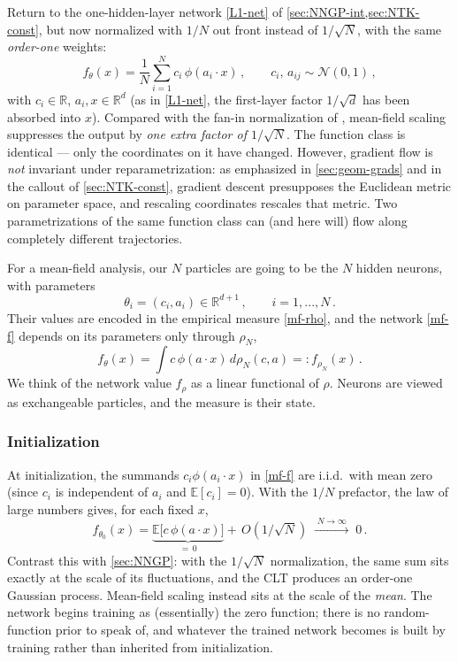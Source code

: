 \documentclass[11pt]{article}
\newcommand{\R}{\mathbb{R}}
\newcommand{\E}{\mathbb{E}}
\newcommand{\CN}{{\mathcal N}}
\begin{document}
Return to the one-hidden-layer network \eqref{L1-net} of \cref{sec:NNGP-int,sec:NTK-const}, but now normalized with $1/N$ out front instead of $1/\sqrt N$, with the same \emph{order-one} weights:
%
\begin{equation} \label{mf-f}
    f_\theta(x) = \frac{1}{N} \sum_{i=1}^N c_i\,\phi(a_i\cdot x)\,,\qquad c_i,\, a_{ij} \sim \CN(0,1)\,,
\end{equation}
%
with $c_i\in\R$, $a_i,x\in\R^d$ (as in \eqref{L1-net}, the first-layer factor $1/\sqrt d$ has been absorbed into $x$). Compared with the fan-in normalization of , mean-field scaling suppresses the output by \emph{one extra factor of $1/\sqrt N$}. The function class is identical --- only the coordinates on it have changed. However, gradient flow is \emph{not} invariant under reparametrization: as emphasized in \cref{sec:geom-grads} and in the callout of \cref{sec:NTK-const}, gradient descent presupposes the Euclidean metric on parameter space, and rescaling coordinates rescales that metric. Two parametrizations of the same function class can (and here will) flow along completely different trajectories.

For a mean-field analysis, our $N$ particles are going to be the $N$ hidden neurons, with parameters
%
\begin{equation}
    \theta_i = (c_i,a_i) \in \R^{d+1}\,,\qquad i=1,...,N\,.
\end{equation}
%
Their values are encoded in the empirical measure \eqref{mf-rho}, and the network \eqref{mf-f} depends on its parameters only through $\rho_N$,
%
\begin{equation} \label{mf-frho}
    f_\theta(x) = \int c\,\phi(a\cdot x)\,d\rho_N(c,a) =: f_{\rho_N}(x)\,.
\end{equation}
%
We think of the network value $f_\rho$ as a linear functional of $\rho$. Neurons are viewed as exchangeable particles, and the measure is their state.

\subsubsection{Initialization}

At initialization, the summands $c_i\phi(a_i\cdot x)$ in \eqref{mf-f} are i.i.d.\ with mean zero (since $c_i$ is independent of $a_i$ and $\E[c_i]=0$). With the $1/N$ prefactor, the law of large numbers gives, for each fixed $x$,
%
\begin{equation}
    f_{\theta_0}(x) = \underbrace{\E\big[c\,\phi(a\cdot x)\big]}_{=\,0} + \,O(1/\sqrt N) \;\xrightarrow{\;N\to\infty\;}\; 0\,.
\end{equation}
%
Contrast this with \cref{sec:NNGP}: with the $1/\sqrt N$ normalization, the same sum sits exactly at the scale of its fluctuations, and the CLT produces an order-one Gaussian process. Mean-field scaling instead sits at the scale of the \emph{mean}.
The network begins training as (essentially) the zero function; there is no random-function prior to speak of, and whatever the trained network becomes is built by training rather than inherited from initialization.
\end{document}
